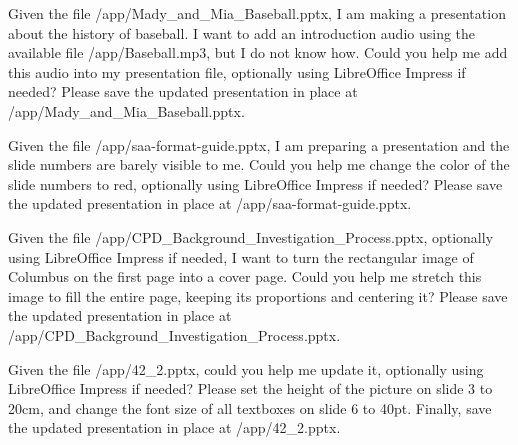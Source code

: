 \documentclass{llmxive}
\begin{document}
\begin{instructionbox}
Given the file \textasciigrave{}/app/Mady\_and\_Mia\_Baseball.pptx\textasciigrave{}, I am making a presentation about the history of baseball. I want to add an introduction audio using the available file \textasciigrave{}/app/Baseball.mp3\textasciigrave{}, but I do not know how. Could you help me add this audio into my presentation file, optionally using LibreOffice Impress if needed? Please save the updated presentation in place at \textasciigrave{}/app/Mady\_and\_Mia\_Baseball.pptx\textasciigrave{}.
\end{instructionbox}

\begin{instructionbox}
Given the file \textasciigrave{}/app/saa-format-guide.pptx\textasciigrave{}, I am preparing a presentation and the slide numbers are barely visible to me. Could you help me change the color of the slide numbers to red, optionally using LibreOffice Impress if needed? Please save the updated presentation in place at \textasciigrave{}/app/saa-format-guide.pptx\textasciigrave{}.
\end{instructionbox}

\begin{instructionbox}
Given the file \textasciigrave{}/app/CPD\_Background\_Investigation\_Process.pptx\textasciigrave{}, optionally using LibreOffice Impress if needed, I want to turn the rectangular image of Columbus on the first page into a cover page. Could you help me stretch this image to fill the entire page, keeping its proportions and centering it? Please save the updated presentation in place at \textasciigrave{}/app/CPD\_Background\_Investigation\_Process.pptx\textasciigrave{}.
\end{instructionbox}

\begin{instructionbox}
Given the file \textasciigrave{}/app/42\_2.pptx\textasciigrave{}, could you help me update it, optionally using LibreOffice Impress if needed? Please set the height of the picture on slide 3 to 20cm, and change the font size of all textboxes on slide 6 to 40pt. Finally, save the updated presentation in place at \textasciigrave{}/app/42\_2.pptx\textasciigrave{}.
\end{instructionbox}
\end{document}
